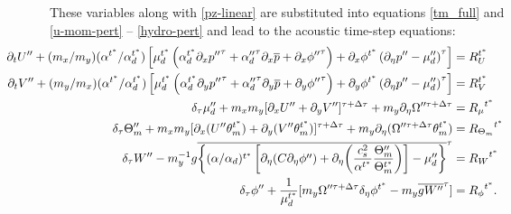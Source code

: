 These variables along with \eqref{pz-linear} 
are substituted into equations
\eqref{tm_full} and \eqref{u-mom-pert} -- \eqref{hydro-pert} and lead to the 
acoustic time-step equations:
%
\begin{align}
  \null\hskip-.5in
\partial_t U'' + (m_x/m_y)(\alpha^{t^*}/\alpha^{t^*}_d) \left[\mu_d^{t^*} \left(
\alpha_d^{t^*} \partial_x {p''}^\tau +  {\alpha_d''}^\tau \partial_x {\overline p}  + \partial_x {\phi''}^\tau \right)
+ \partial_x \phi^{t^*} \left(\partial_\eta {p''} - {\mu''_d} \right)^\tau \right] & = R_U^{t^*}
\label{u-small-step} 
\\
  \null\hskip-.5in
\partial_t V'' + (m_y/m_x)(\alpha^{t^*}/\alpha^{t^*}_d) \left[\mu_d^{t^*} \left(
\alpha_d^{t^*} \partial_y {p''}^\tau +  {\alpha_d''}^\tau \partial_y {\overline p}  + \partial_y {\phi''}^\tau \right)
+ \partial_y \phi^{t^*} \left(\partial_\eta {p''} - {\mu''_d} \right)^\tau \right] & = R_V^{t^*}
\label{v-small-step}
\\
 \delta_\tau \mu_d'' 
 + m_x m_y[\partial_x U'' + \partial_y V'']^{\tau+\Delta \tau} 
+ m_y \partial_\eta {\Omega''^{\tau+\Delta \tau}} &= {R_\mu}^{t^*}  
\label{mu-small-step}
\\
 \delta_\tau \Theta_m'' 
+ m_x m_y[  \partial_x (U''\theta_m^{t^*}) 
      + \partial_y (V''\theta_m^{t^*})]^{\tau+\Delta \tau} 
+ m_y \partial_\eta (\Omega''^{\tau+\Delta \tau} \theta_m^{t^*})
                                                &= {R_{\Theta_m}}^{t^*}  
\label{theta-small-step}
\\
 \delta_\tau W'' 
- m_y^{-1} g\overline{\left\{(\alpha/\alpha_d)^{t^*} \left[
     \partial_\eta (C \partial_\eta \phi'') 
   +
\partial_\eta\biggl({c_s^2\over\alpha^{t^*}}{\Theta_m''\over\Theta_m^{t^*}}\biggr)
\right]
- \mu_d''\right\}}^\tau
                                                   &= {R_W}^{t^*}  
\label{w-small-step}
\\
 \delta_\tau \phi'' + {1\over\mu_d^{t^*}} 
[ m_y \Omega''^{\tau+\Delta \tau}\delta_\eta \phi^{t^*}  - m_y \overline{g W''}^\tau ] 
&= {R_\phi}^{t^*}.
\label{geo-small-step}
\end{align}

